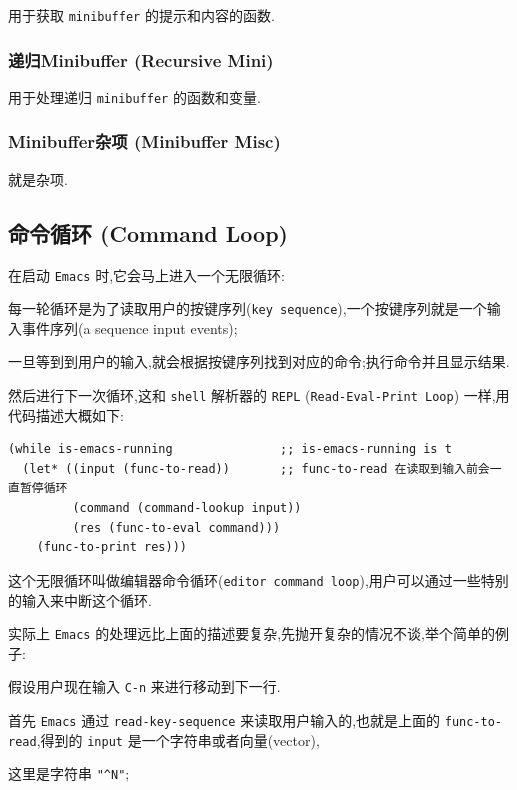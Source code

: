 \documentclass[11pt]{article}
\begin{document}
用于获取 \texttt{minibuffer} 的提示和内容的函数.

\subsubsection{递归Minibuffer (Recursive Mini)}
\label{sec:org98266ac}

用于处理递归 \texttt{minibuffer} 的函数和变量.

\subsubsection{Minibuffer杂项 (Minibuffer Misc)}
\label{sec:org31193c2}

就是杂项.


\subsection{命令循环 (Command Loop)}
\label{sec:orgb2c00cc}

在启动 \texttt{Emacs} 时,它会马上进入一个无限循环:

每一轮循环是为了读取用户的按键序列(\texttt{key sequence}),一个按键序列就是一个输入事件序列(a sequence input events);

一旦等到到用户的输入,就会根据按键序列找到对应的命令;执行命令并且显示结果.

然后进行下一次循环,这和 \texttt{shell} 解析器的 \texttt{REPL} (\texttt{Read-Eval-Print Loop}) 一样,用代码描述大概如下:

\begin{verbatim}
(while is-emacs-running               ;; is-emacs-running is t
  (let* ((input (func-to-read))       ;; func-to-read 在读取到输入前会一直暂停循环
         (command (command-lookup input))
         (res (func-to-eval command)))
    (func-to-print res)))
\end{verbatim}

这个无限循环叫做编辑器命令循环(\texttt{editor command loop}),用户可以通过一些特别的输入来中断这个循环.

实际上 \texttt{Emacs} 的处理远比上面的描述要复杂,先抛开复杂的情况不谈,举个简单的例子:

假设用户现在输入 \texttt{C-n} 来进行移动到下一行.

首先 \texttt{Emacs} 通过 \texttt{read-key-sequence} 来读取用户输入的,也就是上面的 \texttt{func-to-read},得到的 \texttt{input} 是一个字符串或者向量(vector),

这里是字符串 \texttt{"\textasciicircum{}N"};
\end{document}
